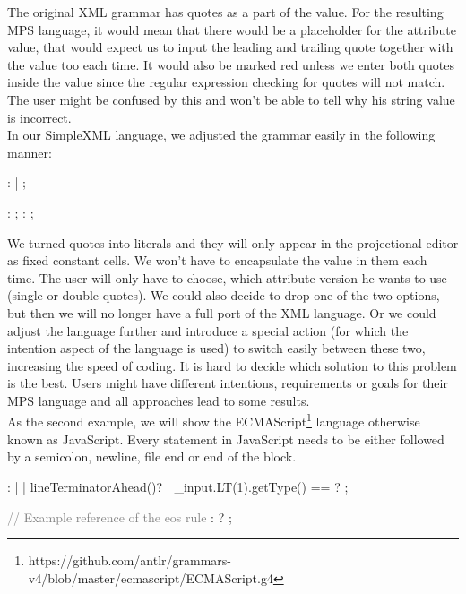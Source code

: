 The original XML grammar has quotes as a part of the value.
For the resulting MPS language, it would mean that there would be a placeholder for the attribute value, that would expect us to input the leading and trailing quote together with the value too each time.
It would also be marked red unless we enter both quotes inside the value since the regular expression checking for quotes will not match.
The user might be confused by this and won't be able to tell why his string value is incorrect.
\\

In our SimpleXML language, we adjusted the grammar easily in the following manner:

\begin{antlr}
	   :      
	            |      
	            ;

	       :   \regex{~["]*} ;
	       :   \regex{~[']*} ;
\end{antlr}

We turned quotes into literals and they will only appear in the projectional editor as fixed constant cells.
We won't have to encapsulate the value in them each time.
The user will only have to choose, which attribute version he wants to use (single or double quotes).
We could also decide to drop one of the two options, but then we will no longer have a full port of the XML language.
Or we could adjust the language further and introduce a special action (for which the intention aspect of the language is used) to switch easily between these two, increasing the speed of coding.
It is hard to decide which solution to this problem is the best.
Users might have different intentions, requirements or goals for their MPS language and all approaches lead to some results.
\\

As the second example, we will show the ECMAScript\footnote{https://github.com/antlr/grammars-v4/blob/master/ecmascript/ECMAScript.g4} language otherwise known as JavaScript.
Every statement in JavaScript needs to be either followed by a semicolon, newline, file end or end of the block.

\begin{antlr}
	            : 
	               | 
	               | {lineTerminatorAhead()}?
	               | {{\_}input.LT(1).getType() == }?
	               ;

	\textcolor{gray}{// Example reference of the eos rule}
	 :  ? 
	               ;
\end{antlr}

